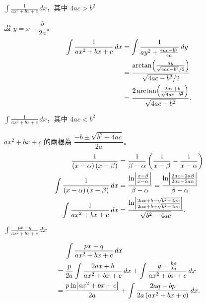 \documentclass{beamer}
\newcommand{\Left} {\mathopen{}\mathclose\bgroup\left}
\newcommand{\Right}{\aftergroup\egroup\right}
\theoremstyle{remark}
\begin{document}
\begin{CJK}{UTF8}{bsmi}
\begin{frame}{$\displaystyle \int \frac{1}{ax^2 + bx + c}\,dx$，其中 $4ac > b^2$}
  \begin{solution}
    設 $y = x + \dfrac{b}{2a}$。
    \begin{align*}
      \int \frac{1}{ax^2 + bx + c}\,dx &= \int \frac{1}{ay^2 + \frac{4ac - b^2}{4a}}\,dy\\
	&= \frac{\arctan \Left( \frac{ay}{\sqrt{4ac - b^2}/2} \Right)}{\sqrt{4ac - b^2}/2}\\
	&= \frac{2 \arctan \Left( \frac{2ax + b}{\sqrt{4ac - b^2}} \Right)}{\sqrt{4ac - b^2}}.
    \end{align*}
  \end{solution}
\end{frame}

\begin{frame}{$\displaystyle \int \frac{1}{ax^2 + bx + c}\,dx$，其中 $4ac < b^2$}
  \begin{solution}
    $ax^2 + bx + c$ 的兩根為 $\dfrac{- b \pm \sqrt{b^2 - 4ac}}{2a}$。
    \begin{align*}
      \frac{1}{\left( x - \alpha \right) (x - \beta)} &= \frac{1}{\beta - \alpha} \left( \frac{1}{x - \beta} 
	- \frac{1}{x - \alpha} \right)\\
      \int \frac{1}{\left( x - \alpha \right) (x - \beta)}\,dx &= \frac{\ln \Left| \frac{x - \beta}{x - \alpha} \Right|}
	{\beta - \alpha} = \frac{\ln \Left| \frac{2ax - 2a\beta}{2ax - 2a\alpha} \Right|} {\beta - \alpha}\\
      \int \frac{1}{ax^2 + bx + c}\,dx &= \frac{\ln \Left| \frac{2ax + b - \sqrt{b^2 - 4ac}}{2ax + b + \sqrt{b^2 - 4ac}}
	\Right|} {\sqrt{b^2 - 4ac}}.
    \end{align*}
  \end{solution}
\end{frame}

\begin{frame}{$\displaystyle \int \frac{px + q}{ax^2 + bx + c}\,dx$}
  \begin{solution}
    \begin{align*}
	 & \int \frac{px + q}{ax^2 + bx + c}\,dx\\
      =\:& \frac{p}{2a} \int \frac{2ax + b}{ax^2 + bx + c}\,dx + \int \frac{q - \frac{bp}{2a}}{ax^2 + bx + c}\,dx\\
      =\:& \frac{p \ln \Left| ax^2 + bx + c \Right|}{2a} + \int \frac{2aq - bp}{2a \left( ax^2 + bx + c \right)}\,dx.
    \end{align*}
  \end{solution}
\end{frame}


\end{CJK}
\end{document}
